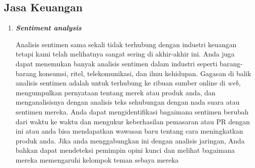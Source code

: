 \subsection{Jasa Keuangan}
\begin{enumerate}
    

\item \textbf{\textit{Sentiment analysis}}
\par Analisis sentimen sama sekali tidak terhubung dengan industri keuangan tetapi kami telah melihatnya sangat sering di akhir-akhir ini. Anda juga dapat menemukan banyak analisis sentimen dalam industri seperti barang-barang konsumsi, ritel, telekomunikasi, dan ilmu kehidupan. Gagasan di balik analisis sentimen adalah untuk terhubung ke ribuan sumber online di \textit{web,} mengumpulkan pernyataan tentang merek atau produk anda, dan menganalisisnya dengan analisis teks sehubungan dengan nada suara atau sentimen mereka. Anda dapat mengidentifikasi bagaimana sentimen berubah dari waktu ke waktu dan mengukur keberhasilan pemasaran atau PR dengan ini atau anda bisa mendapatkan wawasan baru tentang cara meningkatkan produk anda. Jika anda menggabungkan ini dengan analisis jaringan, Anda bahkan dapat mendeteksi pemimpin opini kunci dan melihat bagaimana mereka memengaruhi kelompok teman sebaya mereka



\end{enumerate}

